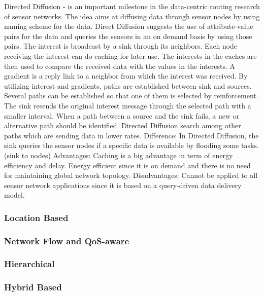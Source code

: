 Directed Diffusion - is an important milestone in the data-centric routing research of sensor networks. The idea aims at diffusing data through sensor nodes by using naming scheme for the data. Direct Diffusion suggests the use of attribute-value pairs for the data and queries the sensors in an on demand basis by using those pairs. The interest is broadcast by a sink through its neighbors. Each node receiving the interest can do caching for later use. The interests in the caches are then used to compare the received data with the values in the interests. A gradient is a reply link to a neighbor from which the interest was received. By utilizing interest and gradients, paths are established between sink and sources. Several paths can be established so that one of them is selected by reinforcement. The sink resends the original interest message through the selected path with a smaller interval. When a path between a source and the sink fails, a new or alternative path should be identified. Directed Diffusion search among other paths which are sending data in lower rates. 
Difference: In Directed Diffusion, the sink queries the sensor nodes if a specific data is available by flooding some tasks. (sink to nodes)
Advantages: Caching is a big advantage in term of energy efficiency and delay. Energy efficient since it is on demand and there is no need for maintaining global network topology.
Disadvantages: Cannot be applied to all sensor network applications since it is based on a query-driven data delivery model.

\subsubsection{Location Based}

\subsubsection{Network Flow and QoS-aware}

\subsubsection{Hierarchical}

\subsubsection{Hybrid Based}

